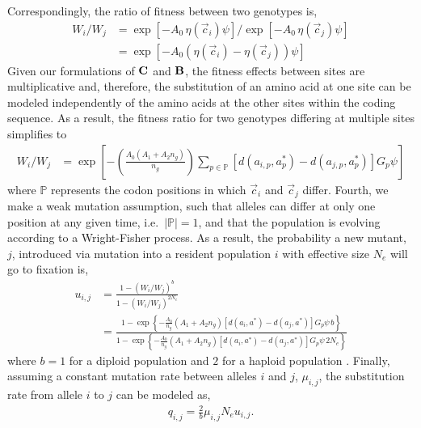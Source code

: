 \documentclass[onecolumn,letterpaper,fleqn,nogrid]{myMBE}%
\newcommand{\Cost}{\ensuremath{\text{\textbf{C}}}\xspace}
\newcommand{\Func}{\ensuremath{\text{\textbf{B}}}\xspace}
\newcommand{\Ne}{\ensuremath{{N_e}}\xspace} %
\newcommand{\aip}{\ensuremath{a_{i,p}}\xspace}
\newcommand{\ajp}{\ensuremath{a_{j,p}}\xspace}
\newcommand{\aopt}{\ensuremath{a^*}\xspace}
\newcommand{\aoptp}{\ensuremath{a^*_p}\xspace}
\newcommand{\cveci}{\ensuremath{\cvec_i}\xspace}
\newcommand{\cvecj}{\ensuremath{\cvec_j}\xspace}
\newcommand{\cvec}{\ensuremath{\Vec{c}}\xspace}
\newcommand{\muij}{\ensuremath{\mu_{i,j}}\xspace}
\newcommand{\setP}{\ensuremath{\mathbb{P}}\xspace}
\renewcommand{\ng}{\ensuremath{{n_g}}\xspace}
\begin{document}
Correspondingly, the ratio of fitness between two genotypes is,
\begin{align*}
  W_i/W_j &=  \exp\left[- A_0 \, \eta(\cveci) \psi\right]/\exp\left[- A_0 \, \eta(\cvecj) \psi\right] \nonumber \\
  &=  \exp\left[- A_0 \left(\eta(\cveci)- \eta(\cvecj)\right) \psi\right] %
\end{align*}
Given our formulations of \Cost and \Func, the fitness effects between sites are multiplicative and, therefore, the substitution of an amino acid at one site can be modeled independently of the amino acids at the other sites within the coding sequence.
As a result, the fitness ratio for two genotypes differing at multiple sites simplifies to
\begin{align*}
  W_i/W_j  &= \exp\left[- \left(\frac{A_0 \left(A_1 + A_2 \ng\right)}{\ng}\right)\sum_{p \in \setP} \left[d\left(\aip,\aoptp\right) - d\left(\ajp,\aoptp\right)\right] G_p \psi \right]
\end{align*}
where \setP represents the codon positions in which \cveci and \cvecj differ.
Fourth, we make a weak mutation assumption, such that alleles can differ at only one position at any given time, i.e.~$|\setP| = 1$, and that the population is evolving according to a Wright-Fisher process.
As a result, the probability a new mutant, $j$, introduced via mutation into a resident population $i$ with effective size \Ne will go to fixation is,
\begin{align*}
  u_{i,j} &=  \frac{1 - \left(W_i/W_j\right)^b}{1 - \left(W_i/W_j\right)^{2 \Ne}}\\
   &= \frac{1- \exp\left\{- \frac{A_0}{\ng} \left(A_1 + A_2 \ng\right) \left[d\left(a_i,\aopt\right) - d\left(a_j,\aopt\right)\right] G_p \psi \,  b\right\}}  {1-\exp\left\{- \frac{A_0}{\ng} \left(A_1 + A_2 \ng\right) \left[d\left(a_i,\aopt\right) - d\left(a_j,\aopt\right)\right] G_p \psi \, 2\Ne\right\}}
\end{align*}
where $b=1$ for a diploid population and $2$ for a haploid population \citep{Kimura1962,Wright1969,Iwasa1988,BergAndLassig2003,SellaAndHirsh2005}.
Finally, assuming a constant mutation rate between alleles $i$ and $j$, $\muij$, the substitution rate from allele $i$ to $j$ can be modeled as,
\begin{align*}
  q_{i,j} = \frac{2}{b} \muij \Ne u_{i,j}.
\end{align*}
\end{document}
